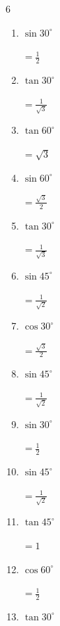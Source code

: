 \begin{multicols}{6}
\begin{enumerate}
        $\displaystyle =\frac{1}{\sqrt{2}}$

  \item $\displaystyle \sin{30^\circ}$

        $\displaystyle =\frac{1}{2}$

  \item $\displaystyle \tan{30^\circ}$

        $\displaystyle =\frac{1}{\sqrt{3}}$

\columnbreak %

  \item $\displaystyle \tan{60^\circ}$

        $\displaystyle =\sqrt{3}$

  \item $\displaystyle \sin{60^\circ}$

        $\displaystyle =\frac{\sqrt{3}}{2}$

  \item $\displaystyle \tan{30^\circ}$

        $\displaystyle =\frac{1}{\sqrt{3}}$

  \item $\displaystyle \sin{45^\circ}$

        $\displaystyle =\frac{1}{\sqrt{2}}$

  \item $\displaystyle \cos{30^\circ}$

        $\displaystyle =\frac{\sqrt{3}}{2}$

  \item $\displaystyle \sin{45^\circ}$

        $\displaystyle =\frac{1}{\sqrt{2}}$

  \item $\displaystyle \sin{30^\circ}$

        $\displaystyle =\frac{1}{2}$

  \item $\displaystyle \sin{45^\circ}$

        $\displaystyle =\frac{1}{\sqrt{2}}$

  \item $\displaystyle \tan{45^\circ}$

        $\displaystyle =1$

  \item $\displaystyle \cos{60^\circ}$

        $\displaystyle =\frac{1}{2}$

  \item $\displaystyle \tan{30^\circ}$


\end{enumerate}
\end{multicols}
